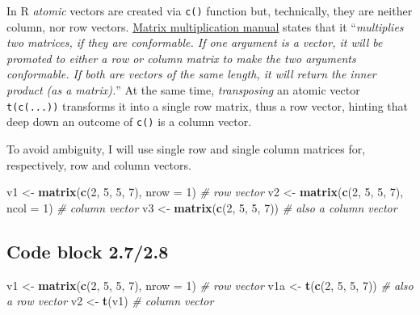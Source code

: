 \documentclass[
]{book}
\newenvironment{Shaded}{\begin{snugshade}}{\end{snugshade}}
\newcommand{\CommentTok}[1]{\textcolor[rgb]{0.56,0.35,0.01}{\textit{#1}}}
\newcommand{\DataTypeTok}[1]{\textcolor[rgb]{0.13,0.29,0.53}{#1}}
\newcommand{\DecValTok}[1]{\textcolor[rgb]{0.00,0.00,0.81}{#1}}
\newcommand{\KeywordTok}[1]{\textcolor[rgb]{0.13,0.29,0.53}{\textbf{#1}}}
\newcommand{\NormalTok}[1]{#1}
\newcommand{\StringTok}[1]{\textcolor[rgb]{0.31,0.60,0.02}{#1}}
\begin{document}
In R \emph{atomic} vectors are created via \texttt{c()} function but, technically, they are neither column, nor row vectors. \href{https://stat.ethz.ch/R-manual/R-devel/library/base/html/matmult.html}{Matrix multiplication manual} states that it ``\emph{multiplies two matrices, if they are conformable. If one argument is a vector, it will be promoted to either a row or column matrix to make the two arguments conformable. If both are vectors of the same length, it will return the inner product (as a matrix).}'' At the same time, \emph{transposing} an atomic vector \texttt{t(c(...))} transforms it into a single row matrix, thus a row vector, hinting that deep down an outcome of \texttt{c()} is a column vector.

To avoid ambiguity, I will use single row and single column matrices for, respectively, row and column vectors.

\begin{Shaded}
\begin{Highlighting}[]
\NormalTok{v1 \textless{}{-}}\StringTok{ }\KeywordTok{matrix}\NormalTok{(}\KeywordTok{c}\NormalTok{(}\DecValTok{2}\NormalTok{, }\DecValTok{5}\NormalTok{, }\DecValTok{5}\NormalTok{, }\DecValTok{7}\NormalTok{), }\DataTypeTok{nrow =} \DecValTok{1}\NormalTok{) }\CommentTok{\# row vector}
\NormalTok{v2 \textless{}{-}}\StringTok{ }\KeywordTok{matrix}\NormalTok{(}\KeywordTok{c}\NormalTok{(}\DecValTok{2}\NormalTok{, }\DecValTok{5}\NormalTok{, }\DecValTok{5}\NormalTok{, }\DecValTok{7}\NormalTok{), }\DataTypeTok{ncol =} \DecValTok{1}\NormalTok{) }\CommentTok{\# column vector}
\NormalTok{v3 \textless{}{-}}\StringTok{ }\KeywordTok{matrix}\NormalTok{(}\KeywordTok{c}\NormalTok{(}\DecValTok{2}\NormalTok{, }\DecValTok{5}\NormalTok{, }\DecValTok{5}\NormalTok{, }\DecValTok{7}\NormalTok{))           }\CommentTok{\# also a column vector}
\end{Highlighting}
\end{Shaded}

\hypertarget{code-block-2.72.8}{%
\subsection*{Code block 2.7/2.8}\label{code-block-2.72.8}}

\begin{Shaded}
\begin{Highlighting}[]
\NormalTok{v1 \textless{}{-}}\StringTok{ }\KeywordTok{matrix}\NormalTok{(}\KeywordTok{c}\NormalTok{(}\DecValTok{2}\NormalTok{, }\DecValTok{5}\NormalTok{, }\DecValTok{5}\NormalTok{, }\DecValTok{7}\NormalTok{), }\DataTypeTok{nrow =} \DecValTok{1}\NormalTok{) }\CommentTok{\# row vector}
\NormalTok{v1a \textless{}{-}}\StringTok{ }\KeywordTok{t}\NormalTok{(}\KeywordTok{c}\NormalTok{(}\DecValTok{2}\NormalTok{, }\DecValTok{5}\NormalTok{, }\DecValTok{5}\NormalTok{, }\DecValTok{7}\NormalTok{))               }\CommentTok{\# also a row vector}
\NormalTok{v2 \textless{}{-}}\StringTok{ }\KeywordTok{t}\NormalTok{(v1)                           }\CommentTok{\# column vector}
\end{Highlighting}
\end{Shaded}
\end{document}
